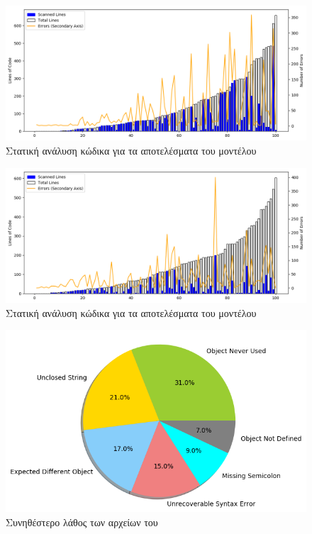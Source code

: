 \newpage
{}


\begin{figure}[!htb]
	\includegraphics[width=\textwidth, keepaspectratio]{images/jshint-githubChar.png}
	\caption{Στατική ανάλυση κώδικα για τα αποτελέσματα του  μοντέλου}
	\label{static-github-char}
\end{figure}

\begin{figure}[!htb]
	\includegraphics[width=\textwidth, keepaspectratio]{images/jshint-githubLabeled.png}
	\caption{Στατική ανάλυση κώδικα για τα αποτελέσματα του  μοντέλου}
	\label{static-github-labeled}
\end{figure}

\begin{figure}[!htb]
	\includegraphics[width=\textwidth, keepaspectratio]{images/MCE-githubchar.png}
	\caption{Συνηθέστερο λάθος των αρχείων του }
	\label{MCE1-githubchar}
\end{figure}

